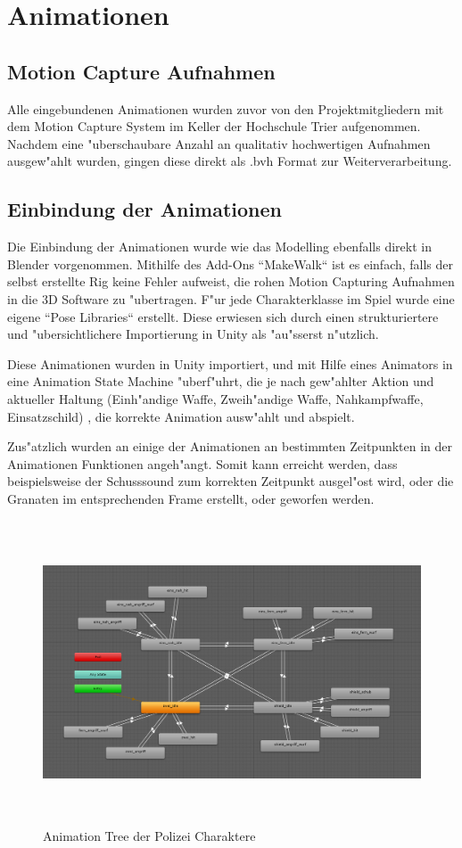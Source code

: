 \chapter{Animationen}

\section{Motion Capture Aufnahmen}
Alle eingebundenen Animationen wurden zuvor von den Projektmitgliedern mit dem Motion Capture System im Keller der Hochschule Trier aufgenommen. Nachdem eine "uberschaubare Anzahl an qualitativ hochwertigen Aufnahmen ausgew"ahlt wurden, gingen diese direkt als .bvh Format zur Weiterverarbeitung.

\section{Einbindung der Animationen}
Die Einbindung der Animationen wurde wie das Modelling ebenfalls direkt in Blender vorgenommen. Mithilfe des Add-Ons ``MakeWalk`` ist es einfach, falls der selbst erstellte Rig keine Fehler aufweist, die rohen Motion Capturing Aufnahmen in die 3D Software zu "ubertragen. F"ur jede Charakterklasse im Spiel wurde eine eigene ``Pose Libraries`` erstellt. Diese erwiesen sich durch einen strukturiertere und "ubersichtlichere Importierung in Unity als "au"sserst n"utzlich.\newline

Diese Animationen wurden in Unity importiert, und mit Hilfe eines Animators in eine Animation State Machine "uberf"uhrt, die je nach gew"ahlter Aktion und aktueller Haltung (Einh"andige Waffe, Zweih"andige Waffe, Nahkampfwaffe, Einsatzschild) , die korrekte Animation ausw"ahlt und abspielt.

Zus"atzlich wurden an einige der Animationen an bestimmten Zeitpunkten in der Animationen Funktionen angeh"angt. Somit kann erreicht werden, dass beispielsweise der Schusssound zum korrekten Zeitpunkt ausgel"ost wird, oder die Granaten im entsprechenden Frame erstellt, oder geworfen werden.

\begin{figure}
	\centering
	\includegraphics[height=9cm]{images/animator_tree.png}
	\caption{Animation Tree der Polizei Charaktere}
	\label{fig:anim_tree_police}
\end{figure}